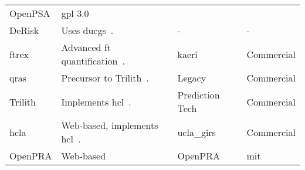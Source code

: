 \begin{table}
{\begin{tabular}{@{}llll@{}}
  OpenPSA &
  \acrshort{gpl} 3.0 \\
DeRisk &
  Uses \acrlong{ducg}s~\cite{derisk1}. &
  - &
  - \\
\acrshort{ftrex} &
  Advanced \acrlong{ft} quantification~\cite{ftrex_manual}. &
  \acrshort{kaeri} &
  Commercial \\
\acrshort{qras} &
  Precursor to Trilith~\cite{qras}. &
  Legacy &
  Commercial \\
Trilith &
  Implements \acrfull{hcl}~\cite{hcl_method}. &
  Prediction Tech&
  Commercial \\
\acrshort{hcla} &
  Web-based, implements \acrshort{hcl}~\cite{hcla_cmd,hcla_web}. &
  \acrshort{ucla_girs} &
  Commercial \\
OpenPRA &
  Web-based \cite{earthperson_introducing_2023} &
  OpenPRA &
  \acrshort{mit} \\
\end{tabular}
}
\end{table}